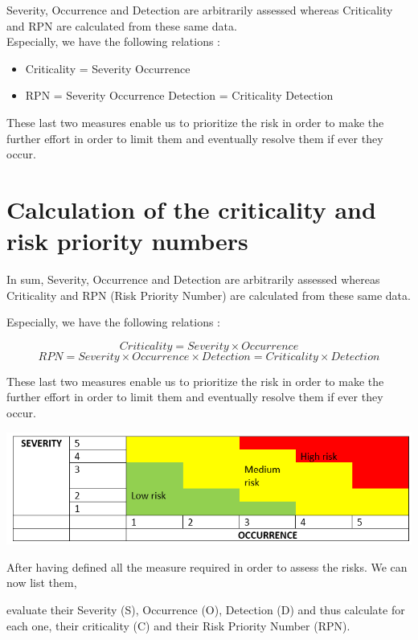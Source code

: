 Severity, Occurrence and Detection are arbitrarily assessed whereas Criticality and RPN are calculated from these same data.\\

Especially, we have the following relations :
\begin{itemize}
    \item Criticality = Severity \* Occurrence
    \item RPN = Severity \* Occurrence \* Detection = Criticality \* Detection
\end{itemize}

These last two measures enable us to prioritize the risk in order to make the further effort in order to limit them and eventually resolve them if ever they occur.

\section{Calculation of the criticality and risk priority numbers}

In sum, Severity, Occurrence and Detection are arbitrarily assessed
whereas Criticality and RPN (Risk Priority Number) are calculated from these same data.

Especially, we have the following relations :

\[Criticality = Severity \times Occurrence\]
\[RPN = Severity \times Occurrence \times Detection = Criticality \times Detection\]

These last two measures enable us to prioritize the risk in order to
make the further effort in order to limit them and eventually resolve
them if ever they occur.

\includegraphics{Img/img-risk.png}

After having defined all the measure required in order to assess the risks. We can now list them,  

evaluate their Severity (S), Occurrence (O), Detection (D) and thus calculate for each one, their criticality (C) and their Risk Priority Number (RPN). 


